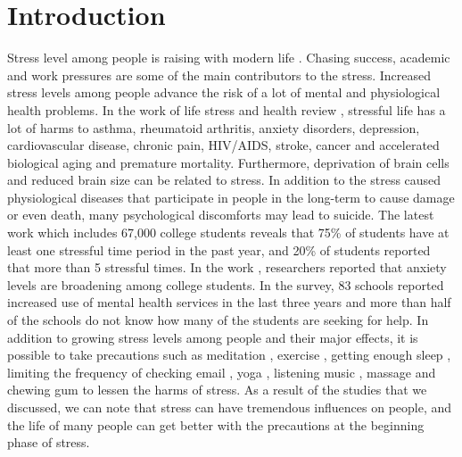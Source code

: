 \documentclass[3p,times,procedia]{elsarticle}
\begin{document}



\section{Introduction}
\label{intro}
Stress level among people is raising with modern life \cite{Weiten2014}. Chasing success, academic and work pressures are some of the main contributors to the stress. Increased stress levels among people advance the risk of a lot of mental and physiological health problems. In the work of life stress and health review \cite{Slavich2016}, stressful life has a lot of harms to asthma, rheumatoid arthritis, anxiety disorders, depression, cardiovascular disease, chronic pain, HIV/AIDS, stroke, cancer and accelerated biological aging and premature mortality. Furthermore, deprivation of brain cells and reduced brain size \cite{Kang2012} can be related to stress. In addition to the stress caused physiological diseases that participate in people in the long-term to cause damage or even death, many psychological discomforts may lead to suicide. The latest work \cite{Liu2019} which includes 67,000 college students reveals that 75\% of students have at least one stressful time period in the past year, and 20\% of students reported that more than 5 stressful times. In the work \cite{Landow2006}, researchers reported that anxiety levels are broadening among college students. In the survey, 83 schools reported increased use of mental health services in the last three years and more than half of the schools do not know how many of the students are seeking for help. In addition to growing stress levels among people and their major effects, it is possible to take precautions such as meditation \cite{Holzel2009}\cite{Smith2013}, exercise \cite{Viveros2013}, getting enough sleep \cite{Kushlev2015}, limiting the frequency of checking email \cite{Brown2009}, yoga \cite{Cervellin2011}, listening music \cite{Rapaport2010}, massage \cite{Scholey2009} and chewing gum \cite{Fehske2011} to lessen the harms of stress. As a result of the studies that we discussed, we can note that stress can have tremendous influences on people, and the life of many people can get better with the precautions at the beginning phase of stress.
  
\end{document}
